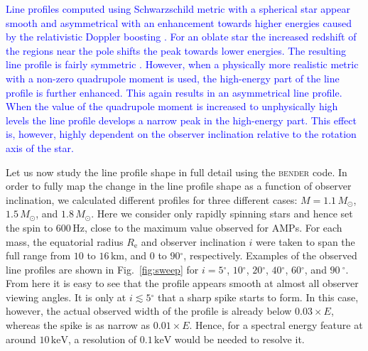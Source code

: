 \documentclass{aa}
\newcommand{\refe}[1]{\textcolor{blue}{{#1}}}
\newcommand{\refedel}[1]{}
\newcommand{\sch}{Schwarzschild }
\newcommand{\Msun}{\ensuremath{M_{\odot}}}
\renewcommand{\deg}{\ensuremath{^{\circ}}}
\begin{document}
\refe{Line profiles computed using \sch metric with a spherical star appear smooth and asymmetrical with an enhancement towards higher energies caused by the relativistic Doppler boosting \citep[see e.g.][]{OP03}.}
\refe{For an oblate star the increased redshift of the regions near the pole shifts the peak towards lower energies.}
\refe{The resulting line profile is fairly symmetric \citep[see e.g.][]{BPO13}.}
\refe{However, when a physically more realistic metric with a non-zero quadrupole moment is used, the high-energy part of the line profile is further enhanced.}
\refe{This again results in an asymmetrical line profile.}
\refe{When the value of the quadrupole moment is increased to unphysically high levels the line profile develops a narrow peak in the high-energy part.}
\refe{This effect is, however, highly dependent on the observer inclination relative to the rotation axis of the star.}


Let us now study the line profile shape in full detail using the \textsc{bender} code.
In order to fully map the change in the line profile shape as a function of observer inclination, we calculated different profiles for three different cases: $M=1.1\,\Msun$, $1.5\,\Msun$, and $1.8\,\Msun$.
Here we consider only rapidly spinning stars and hence set the spin to $600\,\mathrm{Hz}$, close to the maximum value observed for AMPs.
For each mass, the equatorial radius $R_{\mathrm{e}}$ and observer inclination $i$ were taken to span the full range from $10$ to $16\,\mathrm{km}$, and $0$ to $90\deg$, respectively.
Examples of the observed line profiles are shown in Fig.~\ref{fig:sweep} for $i=5\deg$, $10\deg$, $20\deg$, $40\deg$, $60\deg$, and $90~\deg$.
From here it is easy to see that the profile appears smooth at almost all observer viewing angles.
It is only at $i \lesssim 5\deg$ that a sharp spike starts to form.
In this case, however, the actual observed width of the profile is already below $0.03 \times E$, whereas the spike is as narrow as $0.01 \times E$.
Hence, for a spectral energy feature at around $10\,\mathrm{keV}$, a resolution of $0.1\,\mathrm{keV}$ would be needed to resolve it.
\refedel{At the moment, there are no existing observational facilities with sufficient resolution to separate the compact spike from the rest of the line profile.}
\end{document}
